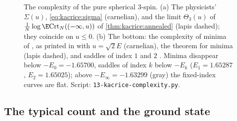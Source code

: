 \begin{refsection}
\begin{figure}[t]
\begin{fullwidth}
\end{fullwidth}
\caption{The complexity of the pure spherical $3$-spin. (a) The physicists' $\Sigma(u)$, \eqref{eq:kacrice:sigma} (carnelian), and the limit $\Theta_3(u)$ of $\frac1N\log\E\kacriceCrt_N((-\infty,u))$ of \cref{thm:kacrice:annealed} (lapis dashed); they coincide on $u\le0$. (b) The bottom: the complexity of minima of \textcite{CrisantiSommers1995}, as printed in \textcite[eq.~(2.18)]{AuffingerBenArousCerny2013} with $u=\sqrt2E$ (carnelian), the theorem for minima (lapis dashed), and saddles of index $1$ and $2$ \parencite[Theorem~2.5]{AuffingerBenArousCerny2013}. Minima disappear below $-E_0=-1.65700$, saddles of index $k$ below $-E_k$ ($E_1=1.65287$, $E_2=1.65025$); above $-E_\infty=-1.63299$ (gray) the fixed-index curves are flat. Script: \texttt{13-kacrice-complexity.py}.}\label{fig:kacrice:complexity}
\end{figure}

\subsection{The typical count and the ground state}\label{sec:kacrice:replicas}


\end{refsection}
